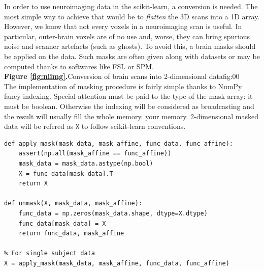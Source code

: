 \documentclass{frontiersSCNS} %
\begin{document}
In order to use neuroimaging data in the scikit-learn, a
conversion is needed. The most simple way to achieve that would be to
\emph{flatten} the 3D scans into a 1D array. However, we know that not every
voxels in a neuroimaging scan is useful. In particular, outer-brain voxels are
of no use and, worse, they can bring spurious noise and scanner artefacts (such
as ghosts). To avoid this, a brain masks should be applied on the data. Such masks
are often given along with datasets or may be computed thanks to softwares like
FSL or SPM.\\

\textbf{Figure \ref{fig:niimg}.}{Conversion of brain scans into 2-dimensional
data}{fig:00}\\

The implementation of masking procedure is fairly simple thanks to NumPy fancy
indexing. Special attention must be paid to the type of the mask array: it must
be boolean. Otherwise the indexing will be considered as broadcasting and the
result will usually fill the whole memory.
your memory.
2-dimensional masked data will be refered as \texttt{X} to follow scikit-learn
conventions.

\begin{lstlisting}
def apply_mask(mask_data, mask_affine, func_data, func_affine):
    assert(np.all(mask_affine == func_affine))
    mask_data = mask_data.astype(np.bool)
    X = func_data[mask_data].T
    return X

def unmask(X, mask_data, mask_affine):
    func_data = np.zeros(mask_data.shape, dtype=X.dtype)
    func_data[mask_data] = X
    return func_data, mask_affine

% For single subject data
X = apply_mask(mask_data, mask_affine, func_data, func_affine)
\end{lstlisting}




\end{document}
